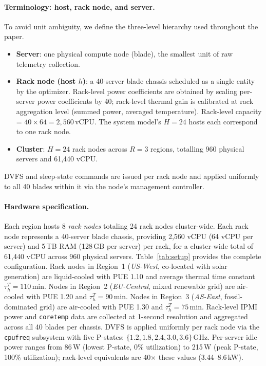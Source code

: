\documentclass[a4paper,fleqn]{cas-dc}
\begin{document}
\paragraph{Terminology: host, rack node, and server.}
To avoid unit ambiguity, we define the three-level hierarchy used throughout the paper.
\begin{itemize}
  \item \textbf{Server}: one physical compute node (blade), the smallest unit of raw telemetry collection.
  \item \textbf{Rack node (host $h$)}: a 40-server blade chassis scheduled as a single entity by the optimizer. Rack-level power coefficients are obtained by scaling per-server power coefficients by 40; rack-level thermal gain is calibrated at rack aggregation level (summed power, averaged temperature). Rack-level capacity = $40 \times 64 = 2{,}560$\,vCPU. The system model's $H=24$ hosts each correspond to one rack node.
  \item \textbf{Cluster}: $H=24$ rack nodes across $R=3$ regions, totalling 960 physical servers and 61,440 vCPU.
\end{itemize}
DVFS and sleep-state commands are issued per rack node and applied uniformly to all 40 blades within it via the node's management controller.

\paragraph{Hardware specification.}
Each region hosts 8 \emph{rack nodes} totaling 24 rack nodes cluster-wide. Each rack node represents a 40-server blade chassis, providing 2,560 vCPU (64 vCPU per server) and 5\,TB RAM (128\,GB per server) per rack, for a cluster-wide total of 61,440 vCPU across 960 physical servers. Table~\ref{tab:setup} provides the complete configuration. Rack nodes in Region~1 (\textit{US-West}, co-located with solar generation) are liquid-cooled with PUE 1.10 and average thermal time constant $\tau^T_h = 110$\,min. Nodes in Region~2 (\textit{EU-Central}, mixed renewable grid) are air-cooled with PUE 1.20 and $\tau^T_h = 90$\,min. Nodes in Region~3 (\textit{AS-East}, fossil-dominated grid) are air-cooled with PUE 1.30 and $\tau^T_h = 75$\,min. Rack-level IPMI power and \texttt{coretemp} data are collected at 1-second resolution and aggregated across all 40 blades per chassis. DVFS is applied uniformly per rack node via the \texttt{cpufreq} subsystem with five P-states: $\{1.2, 1.8, 2.4, 3.0, 3.6\}$\,GHz. Per-server idle power ranges from 86\,W (lowest P-state, 0\% utilization) to 215\,W (peak P-state, 100\% utilization); rack-level equivalents are 40$\times$ these values (3.44--8.6\,kW).
\end{document}
